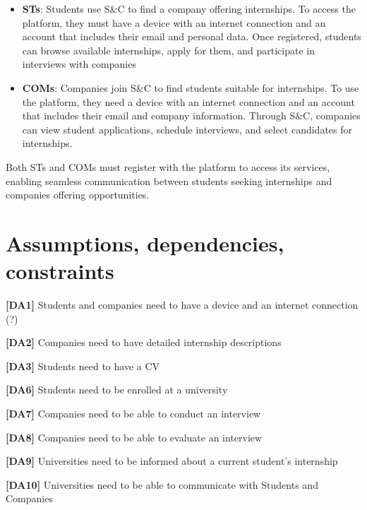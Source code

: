 \begin{itemize}
    \item \textbf{STs}: Students use S\&C to find a company offering internships. To access the platform, they must have a device with an internet connection and an account that includes their email and personal data. Once registered, students can browse available internships, apply for them, and participate in interviews with 
    companies

    \item \textbf{COMs}:  Companies join S\&C to find students suitable for internships. To use the platform, they need a device with an internet connection and an account that includes their email and company information. Through S\&C, companies can view student applications, schedule interviews, and select candidates for internships.
\end{itemize}

Both STs and COMs must register with the platform to access its services, enabling seamless communication between students seeking internships and companies offering opportunities.

\section{Assumptions, dependencies, constraints}
\textbf{[DA1] }Students and companies need to have a device and an internet connection (?)

\textbf{[DA2]} Companies need to have detailed internship descriptions

\textbf{[DA3]} Students need to have a CV

\textbf{[DA6]} Students need to be enrolled at a university 

\textbf{[DA7]} Companies need to be able to conduct an interview

\textbf{[DA8]} Companies need to be able to evaluate an interview

\textbf{[DA9]} Universities need to be informed about a current student's internship

\textbf{[DA10]} Universities need to be able to communicate with Students and Companies
